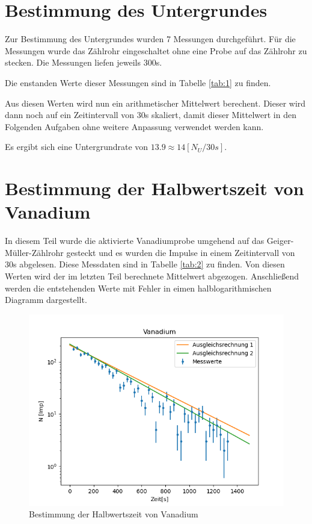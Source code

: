 \documentclass[titlepage=firstcover, captions=tableheading]{scrartcl}
\begin{document}
\section{Bestimmung des Untergrundes}

Zur Bestimmung des Untergrundes wurden 7 Messungen durchgeführt.
Für die Messungen wurde das Zählrohr eingeschaltet ohne eine Probe auf das Zählrohr zu stecken.
Die Messungen liefen jeweils 300s.

\noindent Die enstanden Werte dieser Messungen sind in Tabelle \ref{tab:1} zu finden.

\noindent Aus diesen Werten wird nun ein arithmetischer Mittelwert berechent.
Dieser wird dann noch auf ein Zeitintervall von 30s skaliert, damit dieser Mittelwert in den Folgenden Aufgaben  ohne weitere Anpassung verwendet werden kann.

\noindent Es ergibt sich eine Untergrundrate von $13.9 \approx 14 [N_U/30s]$.

\section{Bestimmung der Halbwertszeit von Vanadium}

In diesem Teil wurde  die aktivierte Vanadiumprobe umgehend auf das Geiger-Müller-Zählrohr gesteckt und es wurden die Impulse in einem Zeitintervall von 30s abgelesen.
Diese Messdaten sind in Tabelle \ref{tab:2} zu finden. 
Von diesen Werten wird der im letzten Teil berechnete Mittelwert abgezogen.
Anschließend werden die entstehenden Werte mit Fehler in eimen halblogarithmischen Diagramm dargestellt.

\begin{figure}[H]
    \centering
    \includegraphics{"22.png"}
    \caption{Bestimmung der Halbwertszeit von Vanadium}
    \label{Fig:Halbwertszeit}
\end{figure}
\end{document}
